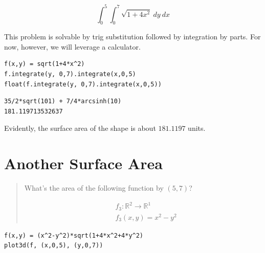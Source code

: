 \documentclass[letterpaper]{article}
\begin{document}
\begin{equation}
  \int_0^5 \int_0^7 \sqrt{1+4x^2}\ dy\ dx
\end{equation}

This problem is solvable by trig substitution followed by integration by parts. For now, however, we will leverage a calculator.

\begin{verbatim}
f(x,y) = sqrt(1+4*x^2)
f.integrate(y, 0,7).integrate(x,0,5)
float(f.integrate(y, 0,7).integrate(x,0,5))
\end{verbatim}

\begin{verbatim}
35/2*sqrt(101) + 7/4*arcsinh(10)
181.119713532637
\end{verbatim}


Evidently, the surface area of the shape is about \(181.1197\) units.

\section{Another Surface Area}
\label{sec:org82191af}
\begin{quote}
What's the area of the following function by \((5,7)\)?

\begin{align}
   &f_3: \mathbb{R}^2 \to \mathbb{R}^1 \\ 
&f_3(x,y) = x^2-y^2
\end{align}
\end{quote}

\begin{verbatim}
f(x,y) = (x^2-y^2)*sqrt(1+4*x^2+4*y^2)
plot3d(f, (x,0,5), (y,0,7))
\end{verbatim}
\end{document}
